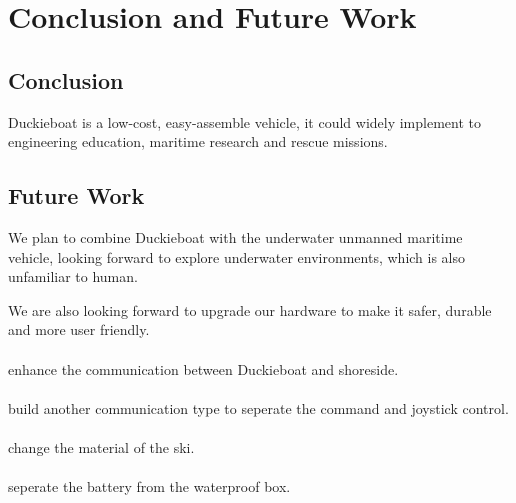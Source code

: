 \section{Conclusion and Future Work}

\subsection{Conclusion}
Duckieboat is a low-cost, easy-assemble vehicle, it could widely implement to engineering education, maritime research and rescue missions.

\subsection{Future Work}
We plan to combine Duckieboat with the underwater unmanned maritime vehicle, looking forward to explore underwater environments, which is also unfamiliar to human.

We are also looking forward to upgrade our hardware to make it safer, durable and more user friendly.
\paragraph{}
enhance the communication between Duckieboat and shoreside.
\paragraph{}
build another communication type to seperate the command and joystick control.
\paragraph{}
change the material of the ski.
\paragraph{}
seperate the battery from the waterproof box.

